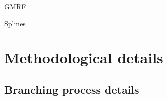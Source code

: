 \documentclass{beamer}
\begin{document}
\begin{frame}[fragile]{GMRF}
\end{frame}

\begin{frame}[fragile]{Splines}
\end{frame}

\section{Methodological details}
\subsection{}


\begin{frame}{}

\end{frame}


\subsection{Branching process details}

\begin{frame}{}

\end{frame}
\end{document}
